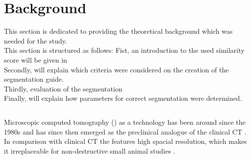 

\chapter{Background}
\label{c:background}

This section is dedicated to providing the theoretical background which was needed for the study.\\
This section is structured as follows:
Fist, an introduction to the used similarity score will be given in %
\\
Secondly,
will explain which criteria were considered on the creation of the segmentation guide.\\
Thirdly, evaluation of the segmentation\\
Finally,
will explain how parameters for correct segmentation were determined. %

\section{\mct}
\label{s:b-microct}
Microscopic computed tomography (\mct) as a technology has been around since the 1980s and has since then emerged as the preclinical analogue of the clinical CT \cite{clarkAdvancesMicroCTImaging2021,ritmanCurrentStatusDevelopments2011}.
In comparison with clinical CT the \mct\space features high spacial resolution, which makes it irreplaceable for non-destructive small animal studies \cite{clarkAdvancesMicroCTImaging2021,ritmanCurrentStatusDevelopments2011,keklikoglouMicroCTBiologicalBiomedical2021}.

